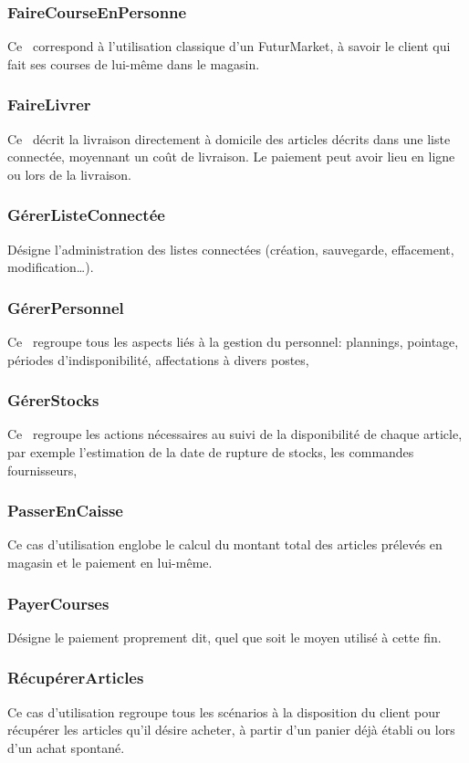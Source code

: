\subsubsection{FaireCourseEnPersonne}
Ce \cu\ correspond à l'utilisation classique d'un FuturMarket, à savoir le client qui fait ses courses de lui-même dans le magasin.

\subsubsection{FaireLivrer}
Ce \cu\ décrit la livraison directement à domicile des articles décrits dans une liste connectée, moyennant un coût de livraison.
Le paiement peut avoir lieu en ligne ou lors de la livraison.

\subsubsection{GérerListeConnectée}
Désigne l'administration des listes connectées (création, sauvegarde, effacement, modification\dots).

\subsubsection{GérerPersonnel}
Ce \cu\ regroupe tous les aspects liés à la gestion du personnel: plannings, pointage, périodes d'indisponibilité, affectations à divers postes, \etc

\subsubsection{GérerStocks}
Ce \cu\ regroupe les actions nécessaires au suivi de la disponibilité de chaque article, par exemple l'estimation de la date de rupture de stocks, les commandes fournisseurs, \etc

\subsubsection{PasserEnCaisse}
Ce cas d'utilisation englobe le calcul du montant total des articles prélevés en magasin et le paiement en lui-même.

\subsubsection{PayerCourses}
Désigne le paiement proprement dit, quel que soit le moyen utilisé à cette fin.

\subsubsection{RécupérerArticles}
Ce cas d'utilisation regroupe tous les scénarios à la disposition du client pour récupérer les articles qu'il désire acheter, à partir d'un panier déjà établi ou lors d'un achat spontané.

